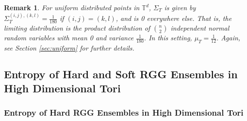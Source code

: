 \documentclass{article}
\newtheorem{remark}{Remark}
\begin{document}
\begin{remark}
    For uniform distributed points in $\mathbb{T}^d$, $\Sigma_T$ is given by $\Sigma_T^{(i,j),(k,l)} = \frac{1}{180}$ if $(i,j) = (k,l)$, and is 0 everywhere else. That is, the limiting distribution is the product distribution of $\binom{n}{2}$ independent normal random variables with mean 0 and variance $\frac{1}{180}$. In this setting, $\mu_T = \frac{1}{12}$. Again, see Section \ref{sec:uniform} for further details.
\end{remark}

\subsection{Entropy of Hard and Soft RGG Ensembles in High Dimensional Tori}
\subsubsection{Entropy of Hard RGG Ensembles in High Dimensional Tori}
\end{document}
